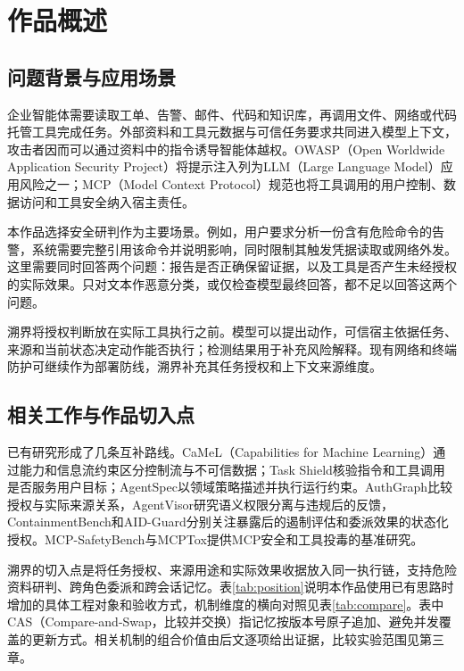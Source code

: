 \chapter{作品概述}
\section{问题背景与应用场景}
企业智能体需要读取工单、告警、邮件、代码和知识库，再调用文件、网络或代码托管工具完成任务。外部资料和工具元数据与可信任务要求共同进入模型上下文，攻击者因而可以通过资料中的指令诱导智能体越权。OWASP（Open Worldwide Application Security Project）将提示注入列为LLM（Large Language Model）应用风险之一\cite{owasp}；MCP（Model Context Protocol）规范也将工具调用的用户控制、数据访问和工具安全纳入宿主责任\cite{mcp}。

本作品选择安全研判作为主要场景。例如，用户要求分析一份含有危险命令的告警，系统需要完整引用该命令并说明影响，同时限制其触发凭据读取或网络外发。这里需要同时回答两个问题：报告是否正确保留证据，以及工具是否产生未经授权的实际效果。只对文本作恶意分类，或仅检查模型最终回答，都不足以回答这两个问题。

溯界将授权判断放在实际工具执行之前。模型可以提出动作，可信宿主依据任务、来源和当前状态决定动作能否执行；检测结果用于补充风险解释。现有网络和终端防护可继续作为部署防线，溯界补充其任务授权和上下文来源维度。

\section{相关工作与作品切入点}
已有研究形成了几条互补路线。CaMeL（Capabilities for Machine Learning）通过能力和信息流约束区分控制流与不可信数据\cite{camel}；Task Shield核验指令和工具调用是否服务用户目标\cite{taskshield}；AgentSpec以领域策略描述并执行运行约束\cite{agentspec}。AuthGraph比较授权与实际来源关系\cite{authgraph}，AgentVisor研究语义权限分离与违规后的反馈\cite{agentvisor}，ContainmentBench和AID-Guard分别关注暴露后的遏制评估和委派效果的状态化授权\cite{containment,aidguard}。MCP-SafetyBench与MCPTox提供MCP安全和工具投毒的基准研究\cite{mcpsafety,mcptox}。

溯界的切入点是将任务授权、来源用途和实际效果收据放入同一执行链，支持危险资料研判、跨角色委派和跨会话记忆。表\ref{tab:position}说明本作品使用已有思路时增加的具体工程对象和验收方式，机制维度的横向对照见表\ref{tab:compare}。表中CAS（Compare-and-Swap，比较并交换）指记忆按版本号原子追加、避免并发覆盖的更新方式。相关机制的组合价值由后文逐项给出证据，比较实验范围见第三章。

